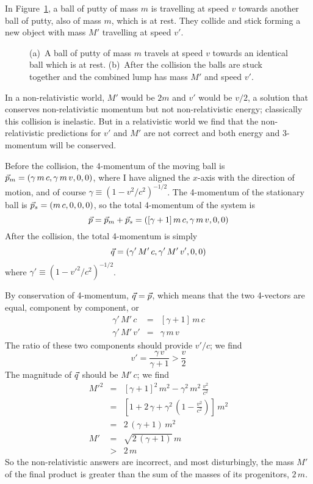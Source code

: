 In Figure~\ref{fig:collision}, a ball of putty of mass $m$ is
travelling at speed $v$ towards another ball of putty, also of mass
$m$, which is at rest.  They collide and stick forming a new object
with mass $M'$ travelling at speed $v'$.
\begin{figure}
\caption[Collision diagram]
{(a)~A ball of putty of mass $m$ travels at speed $v$ towards an
identical ball which is at rest.  (b)~After the collision the balls
are stuck together and the combined lump has mass $M'$ and speed
$v'$.}
\label{fig:collision}
\end{figure}
In a non-relativistic world, $M'$ would be $2m$ and $v'$ would be
$v/2$, a solution that conserves non-relativistic momentum but not
non-relativistic energy; classically this collision is inelastic.  But
in a relativistic world we find that the non-relativistic predictions
for $v'$ and $M'$ are not correct and both energy and 3-momentum will
be conserved.

Before the collision, the 4-momentum of the moving ball is
$\vec{p}_m=(\gamma\, m\, c,\gamma\, m\, v,0,0)$, where I have aligned
the $x$-axis with the direction of motion, and of course
$\gamma\equiv(1-v^2/c^2)^{-1/2}$.  The 4-momentum of the stationary
ball is $\vec{p}_s=(m\, c,0,0,0)$, so the total 4-momentum of the
system is
\begin{equation}
\vec{p}=\vec{p}_m+\vec{p}_s=([\gamma+1]\,m\,c,\gamma\,m\,v,0,0)
\end{equation}
After the collision, the total 4-momentum is simply
\begin{equation}
\vec{q}=(\gamma'\,M'\,c,\gamma'\,M'\,v',0,0)
\end{equation}
where $\gamma'\equiv(1-v'^2/c^2)^{-1/2}$.

By conservation of 4-momentum, $\vec{q}=\vec{p}$, which means that the
two 4-vectors are equal, component by component, or
\begin{eqnarray}
\gamma'\,M'\,c & = & [\gamma+1]\,m\,c \nonumber\\
\gamma'\,M'\,v' & = & \gamma\,m\,v
\end{eqnarray}
The ratio of these two components should provide $v'/c$; we find
\begin{equation}
v' = \frac{\gamma\,v}{\gamma+1} > \frac{v}{2}
\end{equation}
The magnitude of $\vec{q}$ should be $M'\,c$; we find
\begin{eqnarray}
M'^2 & = & [\gamma+1]^2\,m^2 - \gamma^2\,m^2\,\frac{v^2}{c^2} \nonumber\\
& = & \left[1 + 2\,\gamma + \gamma^2\,\left(1-\frac{v^2}{c^2}\right)\right]\,m^2 \nonumber\\
& = & 2\,(\gamma+1)\,m^2 \nonumber\\
M' & = & \sqrt{2\,(\gamma+1)}\,m \nonumber\\
& > & 2\, m
\end{eqnarray}
So the non-relativistic answers are incorrect, and most disturbingly,
the mass $M'$ of the final product is greater than the sum of the
masses of its progenitors, $2\,m$.

